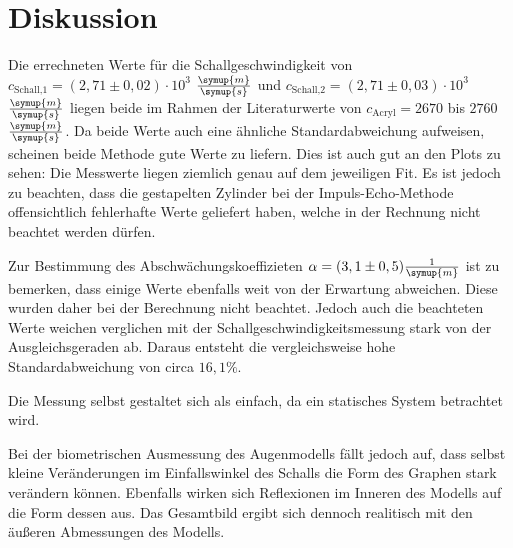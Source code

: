 \section{Diskussion}
\label{sec:Diskussion}


Die errechneten Werte für die Schallgeschwindigkeit von $c_\text{Schall,1} = (2,71 \pm 0,02) \cdot 10^{3}$ $\frac{\symup{m}}{\symup{s}}$ und $c_\text{Schall,2} = (2,71 \pm 0,03) \cdot 10^{3}$ $\frac{\symup{m}}{\symup{s}}$
liegen beide im Rahmen der Literaturwerte von $c_\text{Acryl} = 2670$ bis $2760$ $\frac{\symup{m}}{\symup{s}}$\cite{acryl}.
Da beide Werte auch eine ähnliche Standardabweichung aufweisen, scheinen beide Methode gute Werte zu liefern. Dies ist auch gut an den Plots zu sehen:
Die Messwerte liegen ziemlich genau auf dem jeweiligen Fit.
Es ist jedoch zu beachten, dass die gestapelten Zylinder bei der Impuls-Echo-Methode offensichtlich fehlerhafte Werte geliefert haben, welche in der Rechnung nicht beachtet werden dürfen.

Zur Bestimmung des Abschwächungskoeffizieten $\alpha = (3,1 \pm 0,5) \frac{1}{\symup{m}}$ ist zu bemerken, dass einige Werte ebenfalls weit von der Erwartung abweichen. Diese wurden daher bei der Berechnung nicht beachtet.
Jedoch auch die beachteten Werte weichen verglichen mit der Schallgeschwindigkeitsmessung stark von der Ausgleichsgeraden ab.
Daraus entsteht die vergleichsweise hohe Standardabweichung von circa $16,1 \%$.

Die Messung selbst gestaltet sich als einfach, da ein statisches System betrachtet wird.

Bei der biometrischen Ausmessung des Augenmodells fällt jedoch auf, dass selbst kleine Veränderungen im Einfallswinkel des Schalls die Form des Graphen stark verändern können.
Ebenfalls wirken sich Reflexionen im Inneren des Modells auf die Form dessen aus. Das Gesamtbild ergibt sich dennoch realitisch mit den äußeren Abmessungen des Modells.